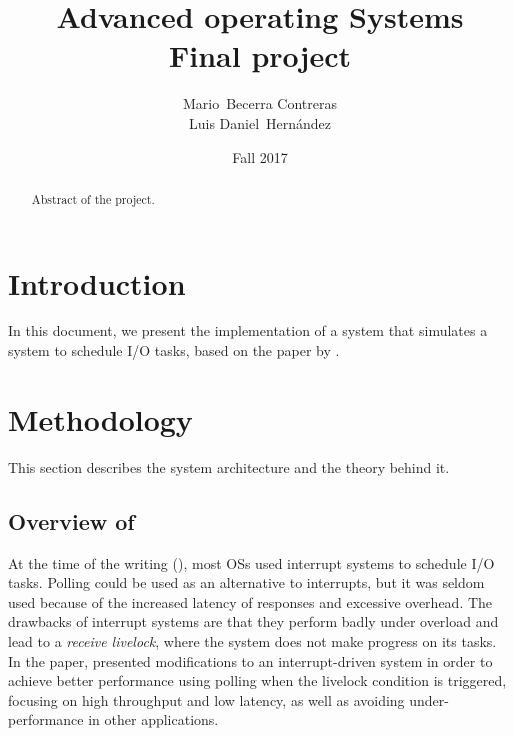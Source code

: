 \documentclass{article}
\begin{document}

\title{Advanced operating Systems \\ Final project}

\author{Mario~Becerra Contreras \\ Luis Daniel~Hernández}

\date{Fall 2017}


\maketitle

\begin{abstract}

Abstract of the project.

\end{abstract}

\section{Introduction}

In this document, we present the implementation of a system that simulates a system to schedule I/O tasks, based on the \citeyear{mogul1997eliminating} paper  by \citeauthor{mogul1997eliminating} \cite{mogul1997eliminating}.


\section{Methodology}

This section describes the system architecture and the theory behind it.

\subsection{Overview of }

At the time of the writing (\citeyear{mogul1997eliminating}), most OSs used interrupt systems to schedule I/O tasks. Polling could be used as an alternative to interrupts, but it was seldom used because of the increased latency of responses and excessive overhead. The drawbacks of interrupt systems are that they perform badly under overload and lead to a \textit{receive livelock}, where the system does not make progress on its tasks. In the paper, \citeauthor{mogul1997eliminating} presented modifications to an interrupt-driven system in order to achieve better performance using polling when the livelock condition is triggered, focusing on high throughput and low latency, as well as avoiding under-performance in other applications.
\end{document}
